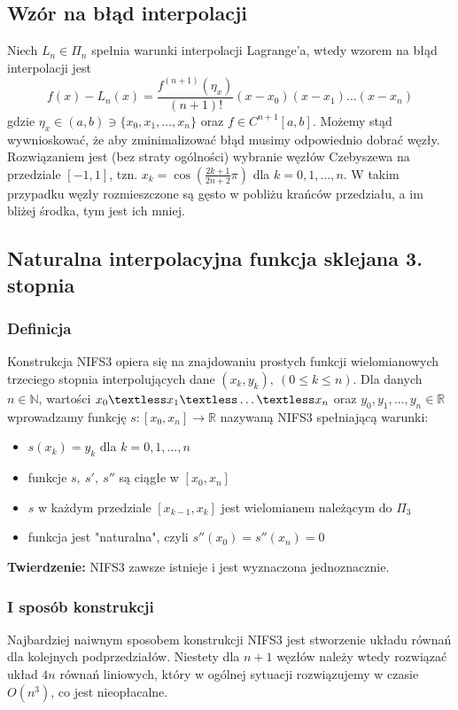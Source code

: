 \documentclass[a4paper,11pt]{article}
\begin{document}
\subsection{Wzór na błąd interpolacji}
Niech $L_n \in \Pi_n$ spełnia warunki interpolacji Lagrange'a, wtedy wzorem na błąd interpolacji jest
$$ f(x)-L_n(x)=\frac{f^{(n+1)}(\eta_x)}{(n+1)!}(x-x_0)(x-x_1)\ldots(x-x_n) $$
gdzie $\eta_x \in (a,b) \ni \{ x_0, x_1, \ldots, x_n\}$ oraz $f\in C^{n+1}[a,b]$. Możemy stąd wywnioskować, że aby zminimalizować błąd musimy odpowiednio dobrać węzły. Rozwiązaniem jest (bez straty ogólności) wybranie węzłów Czebyszewa na przedziale $[-1,1]$, tzn. $x_k = \cos \left( \frac{2k+1}{2n+2}\pi \right)$ dla $k=0,1,\ldots, n$. W takim przypadku węzły rozmieszczone są gęsto w pobliżu krańców przedziału, a im bliżej środka, tym jest ich mniej.

\subsection{Naturalna interpolacyjna funkcja sklejana 3. stopnia}
\subsubsection{Definicja} 
Konstrukcja NIFS3 opiera się na znajdowaniu prostych funkcji wielomianowych trzeciego stopnia interpolujących dane $(x_k, y_k), \ (0\leq k \leq n)$. Dla danych $n\in\mathbb{N}$, wartości $x_0 \textless x_1 \textless \ldots \textless x_n$ oraz $y_0, y_1, \ldots, y_n \in \mathbb{R}$ wprowadzamy funkcję $s: [x_0, x_n]\to \mathbb{R}$ nazywaną NIFS3 spełniającą warunki:
\begin{itemize}
\item $s(x_k) = y_k$ dla $k=0, 1, \ldots, n$
\item funkcje $s, \ s', \ s''$ są ciągłe w $[x_0, x_n]$
\item $s$ w każdym przedziale $[x_{k-1}, x_k]$ jest wielomianem należącym do $\Pi_{3}$
\item funkcja jest "naturalna", czyli $s''(x_0) = s''(x_n) = 0$ 
\end{itemize}
\noindent \textbf{Twierdzenie:} NIFS3 zawsze istnieje i jest wyznaczona jednoznacznie.
\subsubsection{I sposób konstrukcji}
Najbardziej naiwnym sposobem konstrukcji NIFS3 jest stworzenie układu równań dla kolejnych podprzedziałów. Niestety dla $n+1$ węzłów należy wtedy rozwiązać układ $4n$ równań liniowych, który w ogólnej sytuacji rozwiązujemy w czasie $O(n^3)$, co jest nieopłacalne.
\end{document}
